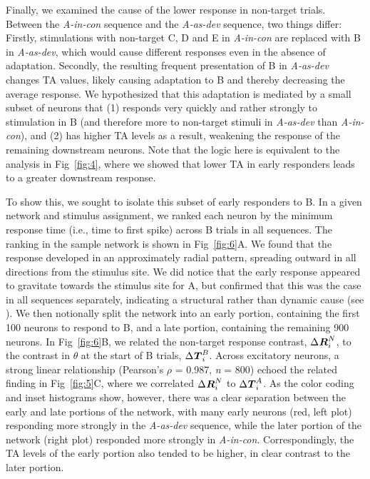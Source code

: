 \documentclass[10pt,letterpaper]{article}
\newcommand{\dev}{\textit{A-as-dev}}
\newcommand{\msc}{\textit{A-in-con}}
\newcommand{\std}{\textit{A-as-std}}
\newcommand{\ifstringequal}[4]{%
  \ifnum\pdfstrcmp{#1}{#2}=0
  #3%
  \else
  #4%
  \fi
}
\newcommand{\seqreplace}[1]{\ifstringequal{dev}{#1}{\dev}{%
    \ifstringequal{std}{#1}{\std}{%
        \ifstringequal{msc}{#1}{\msc}{#1}%
    }%
}}
\newcommand{\R}[3][]{{}^{\seqreplace{#1}}_{}\boldsymbol R^{#2}_{#3}}
\newcommand{\T}[3][]{{}^{\seqreplace{#1}}_{}\boldsymbol T^{#2}_{#3}}
\newcommand{\FIG}[1]{Fig~\ref{fig:#1}}
\newcommand{\statistic}[2]{\textit{#1} = \num{#2}}
\begin{document}
Finally, we examined the cause of the lower response in non-target trials. Between the \msc{} sequence and the \dev{} sequence, two things differ: Firstly, stimulations with non-target C, D and E in \msc{} are replaced with B in \dev{}, which would cause different responses even in the absence of adaptation. Secondly, the resulting  frequent presentation of B in \dev{} changes TA values, likely causing adaptation to B and thereby decreasing the average response. We hypothesized that this adaptation is mediated by a small subset of neurons that (1) responds very quickly and rather strongly to stimulation in B (and therefore more to non-target stimuli in \dev{} than \msc{}), and (2) has higher TA levels as a result, weakening the response of the remaining downstream neurons. Note that the logic here is equivalent to the analysis in \FIG{4}, where we showed that lower TA in early responders leads to a greater downstream response.

To show this, we sought to isolate this subset of early responders to B. In a given network and stimulus assignment, we ranked each neuron by the minimum response time (i.e., time to first spike) across B trials in all sequences. The ranking in the sample network is shown in \FIG{6}A. We found that the response developed in an approximately radial pattern, spreading outward in all directions from the stimulus site. We did notice that the early response appeared to gravitate towards the stimulus site for A, but confirmed that this was the case in all sequences separately, indicating a structural rather than dynamic cause (see ). We then notionally split the network into an early portion, containing the first 100 neurons to respond to B, and a late portion, containing the remaining 900 neurons. In \FIG{6}B, we related the non-target response contrast, $\Delta \R{N}{i}$, to the contrast in $\theta$ at the start of B trials, $\Delta \T{B}{i}$. Across excitatory neurons, a strong linear relationship (Pearson's $\rho$ = \num{0.987}, \statistic{n}{800}) echoed the related finding in \FIG{5}C, where we correlated $\Delta \R{N}{i}$ to $\Delta \T{A}{i}$. As the color coding and inset histograms show, however, there was a clear separation between the early and late portions of the network, with many early neurons (red, left plot) responding more strongly in the \dev{} sequence, while the later portion of the network (right plot) responded more strongly in \msc{}. Correspondingly, the TA levels of the early portion also tended to be higher, in clear contrast to the later portion.
\end{document}
